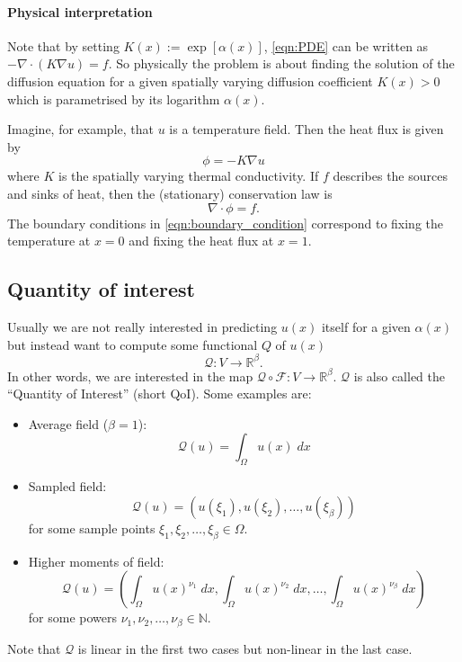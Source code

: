 \documentclass[11pt]{article}
\begin{document}
\paragraph{Physical interpretation}
Note that by setting $K(x):=\exp[\alpha(x)]$, \eqref{eqn:PDE} can be written as $-\nabla\cdot (K\nabla u)=f$. So physically the problem is about finding the solution of the diffusion equation for a given spatially varying diffusion coefficient $K(x)>0$ which is parametrised by its logarithm $\alpha(x)$.

Imagine, for example, that $u$ is a temperature field. Then the heat flux is given by
\begin{equation}
    \phi = - K\nabla u
\end{equation}
where $K$ is the spatially varying thermal conductivity. If $f$ describes the sources and sinks of heat, then the (stationary) conservation law is
\begin{equation}
    \nabla \cdot \phi = f.
\end{equation}
The boundary conditions in \eqref{eqn:boundary_condition} correspond to fixing the temperature at $x=0$ and fixing the heat flux at $x=1$.
\subsection{Quantity of interest}
Usually we are not really interested in predicting $u(x)$ itself for a given $\alpha(x)$ but instead want to compute some functional $Q$ of $u(x)$
\begin{equation}
    \mathcal{Q}: V\rightarrow \mathbb{R}^\beta.\label{eqn:QoI}
\end{equation}
In other words, we are interested in the map $\mathcal{Q}\circ \mathcal{F}:V\rightarrow \mathbb{R}^\beta$. $\mathcal{Q}$ is also called the ``Quantity of Interest'' (short QoI). Some examples are:
\begin{itemize}
    \item Average field ($\beta=1$):
    \begin{equation}
        \mathcal{Q}(u) = \int_\Omega u(x)\;dx
    \end{equation}
    \item Sampled field:
    \begin{equation}
        \mathcal{Q}(u) = (u(\xi_1),u(\xi_2),\dots,u(\xi_\beta))
    \end{equation}
     for some sample points $\xi_1,\xi_2,\dots,\xi_\beta\in\Omega$.
    \item Higher moments of field:
    \begin{equation}
        \mathcal{Q}(u) = \left(\int_\Omega u(x)^{\nu_1}\;dx,\int_\Omega u(x)^{\nu_2}\;dx,\dots,\int_\Omega u(x)^{\nu_\beta}\;dx\right)
    \end{equation}
    for some powers $\nu_1,\nu_2,\dots,\nu_\beta\in\mathbb{N}$.
\end{itemize}
Note that $\mathcal{Q}$ is linear in the first two cases but non-linear in the last case.
\end{document}
